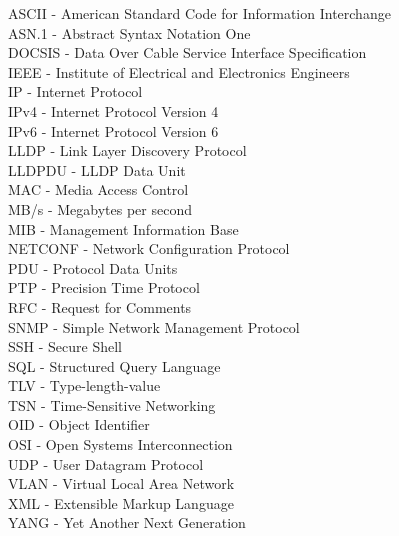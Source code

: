 ASCII - American Standard Code for Information Interchange\\
ASN.1 - Abstract Syntax Notation One\\
DOCSIS - Data Over Cable Service Interface Specification\\
IEEE - Institute of Electrical and Electronics Engineers\\
IP - Internet Protocol\\
IPv4 - Internet Protocol Version 4\\
IPv6 - Internet Protocol Version 6\\
LLDP - Link Layer Discovery Protocol\\
LLDPDU - LLDP Data Unit\\
MAC - Media Access Control\\
MB/s - Megabytes per second\\
MIB - Management Information Base\\
NETCONF - Network Configuration Protocol\\
PDU -  Protocol Data Units\\
PTP - Precision Time Protocol\\
RFC - Request for Comments\\
SNMP - Simple Network Management Protocol\\
SSH - Secure Shell\\
SQL - Structured Query Language\\
TLV - Type-length-value\\
TSN - Time-Sensitive Networking\\
OID - Object Identifier\\
OSI - Open Systems Interconnection\\
UDP - User Datagram Protocol\\
VLAN - Virtual Local Area Network\\
XML - Extensible Markup Language\\
YANG - Yet Another Next Generation\\